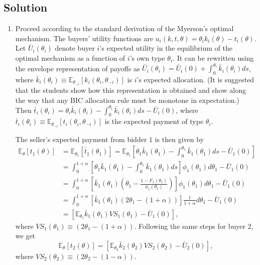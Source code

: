 \documentclass[a4paper]{article}
\begin{document}
\subsection*{Solution}
\begin{enumerate}
	\item Proceed according to the standard derivation of the Myerson's optimal mechanism. The buyers' utility functions are $u_i(k,t,\theta) = \theta_i k_i(\theta) - t_i(\theta)$. Let $\bar{U}_i(\theta_i)$ denote buyer $i$'s expected utility in the equilibrium of the optimal mechanism as a function of $i$'s own type $\theta_i$. It can be rewritten using the envelope representation of payoffs as $\bar{U}_i(\theta_i) = \bar{U}_i(0) + \int_0^{\theta_i} \bar{k}_i(\theta_i) ds$, where $\bar{k}_i(\theta_i) \equiv \mathbb{E}_{\theta_{-i}}[ k_i(\theta_i,\theta_{-i}) ]$ is $i$'s expected allocation. (It is suggested that the students show how this representation is obtained and show along the way that any BIC allocation rule must be monotone in expectation.)
	Then $\bar{t}_i(\theta_i) = \theta_i \bar{k}_i(\theta_i) - \int_0^{\theta_i} \bar{k}_i(\theta_i) ds - \bar{U}_i(0)$, where $\bar{t}_i(\theta_i) \equiv \mathbb{E}_{\theta_{-i}}[ t_i(\theta_i,\theta_{-i}) ]$ is the expected payment of type $\theta_i$.
	
	The seller's expected payment from bidder $1$ is then given by
	\begin{align*}
		\mathbb{E}_\theta \left[ t_1(\theta) \right] &= \mathbb{E}_{\theta_1} \left[ \bar{t}_1(\theta_1) \right]
		= \mathbb{E}_{\theta_1} \left[ \theta_1 \bar{k}_1(\theta_1) - \int_0^{\theta_1} \bar{k}_1(\theta_1) ds - \bar{U}_1(0) \right]
		\\ &= \int_0^{1+\alpha} \left[ \theta_1 \bar{k}_1(\theta_1) - \int_0^{\theta_1} \bar{k}_1(\theta_1) ds \right] \phi_1(\theta_1) d\theta_1 - \bar{U}_1(0)
		\\ &= \int_0^{1+\alpha} \left[ \bar{k}_1(\theta_1) \left( \theta_1 - \frac{1-F_1(\theta_1)}{\phi_1(\theta_1)} \right) \right] \phi_1(\theta_1) d\theta_1 - \bar{U}_1(0)
		\\ &= \int_0^{1+\alpha} \left[ \bar{k}_1(\theta_1) \left( 2\theta_1 - (1+\alpha) \right) \right] \frac{1}{1+\alpha} d\theta_1 - \bar{U}_1(0)
		\\ &= \left[ \mathbb{E}_{\theta_1} \bar{k}_1(\theta_1) VS_1(\theta_1) - \bar{U}_1(0) \right],
	\end{align*}
	where $VS_1(\theta_1) \equiv \left( 2\theta_1 - (1+\alpha) \right)$. Following the same steps for buyer 2, we get 
	$$\mathbb{E}_\theta \left[ t_2(\theta) \right] = \left[ \mathbb{E}_{\theta_2} \bar{k}_2(\theta_2) VS_2(\theta_2) - \bar{U}_2(0) \right],$$ where $VS_2(\theta_2) \equiv \left( 2\theta_2 - (1-\alpha) \right)$.
	

\end{enumerate}
\end{document}

